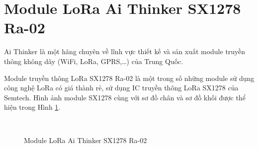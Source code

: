 \section{Module LoRa Ai Thinker SX1278 Ra-02}
Ai Thinker là một hãng chuyên về lĩnh vực thiết kế và sản xuất module truyền thông không dây (WiFi, LoRa, GPRS,…) của Trung Quốc.
\par 
Module truyền thông LoRa SX1278 Ra-02 là một trong số những module sử dụng công nghệ LoRa có giá thành rẻ, sử dụng IC truyền thông LoRa SX1278 của Semtech. Hình ảnh module SX1278 cùng với sơ đồ chân và sơ đồ khối được thể hiện trong Hình \ref{SX1278}.
\begin{figure}[t]
	\centering
	\\
\caption{Module LoRa Ai Thinker SX1278 Ra-02}
\label{SX1278}
\end{figure}
